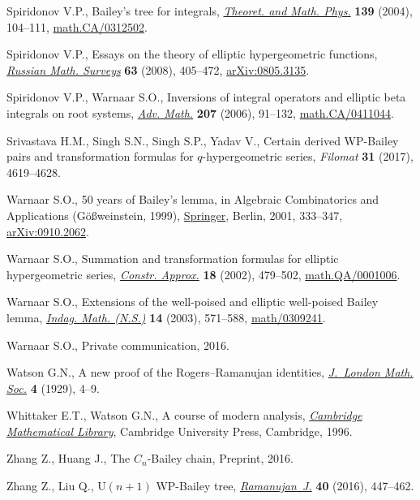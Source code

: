 \documentclass[pdftex]{sigma}
\numberwithin{equation}{section}
\begin{document}
\begin{thebibliography}{99}
Spiridonov V.P., Bailey's tree for integrals, \href{https://doi.org/10.1023/B:TAMP.0000022745.45082.18}{\textit{Theoret. and Math. Phys.}}
 \textbf{139} (2004), 104--111, \href{https://arxiv.org/abs/math.CA/0312502}{math.CA/0312502}.

Spiridonov V.P., Essays on the theory of elliptic hypergeometric functions,
 \href{https://doi.org/10.1070/RM2008v063n03ABEH004533}{\textit{Russian Math. Surveys}} \textbf{63} (2008), 405--472,
 \href{https://arxiv.org/abs/0805.3135}{arXiv:0805.3135}.

Spiridonov V.P., Warnaar S.O., Inversions of integral operators and elliptic
 beta integrals on root systems, \href{https://doi.org/10.1016/j.aim.2005.11.007}{\textit{Adv. Math.}} \textbf{207} (2006),
 91--132, \href{https://arxiv.org/abs/math.CA/0411044}{math.CA/0411044}.

Srivastava H.M., Singh S.N., Singh S.P., Yadav V., Certain derived
 {WP}-{B}ailey pairs and transformation formulas for {$q$}-hypergeometric
 series, \textit{Filomat} \textbf{31} (2017), 4619--4628.

Warnaar S.O., 50 years of {B}ailey's lemma, in Algebraic Combinatorics and
 Applications ({G}\"o\ss weinstein, 1999), \href{https://doi.org/10.1007/978-3-642-59448-9_23}{Springer}, Berlin, 2001, 333--347,
 \href{https://arxiv.org/abs/0910.2062}{arXiv:0910.2062}.

Warnaar S.O., Summation and transformation formulas for elliptic hypergeometric
 series, \href{https://doi.org/10.1007/s00365-002-0501-6}{\textit{Constr. Approx.}} \textbf{18} (2002), 479--502,
 \href{https://arxiv.org/abs/math.QA/0001006}{math.QA/0001006}.

Warnaar S.O., Extensions of the well-poised and elliptic well-poised {B}ailey
 lemma, \href{https://doi.org/10.1016/S0019-3577(03)90061-9}{\textit{Indag. Math. (N.S.)}} \textbf{14} (2003), 571--588,
 \href{https://arxiv.org/abs/math/0309241}{math/0309241}.


Warnaar S.O., {P}rivate communication, 2016.

Watson G.N., A new proof of the {R}ogers--{R}amanujan identities,
 \href{https://doi.org/10.1112/jlms/s1-4.1.4}{\textit{J.~London Math. Soc.}} \textbf{4} (1929), 4--9.

Whittaker E.T., Watson G.N., A course of modern analysis, \href{https://doi.org/10.1017/CBO9780511608759}{\textit{Cambridge
 Mathematical Library}}, Cambridge University Press, Cambridge, 1996.

Zhang Z., Huang J., The ${C}_n$-{B}ailey chain, {P}reprint, 2016.

Zhang Z., Liu Q., {$\mathrm{U}(n+1)$} {WP}-{B}ailey tree, \href{https://doi.org/10.1007/s11139-016-9790-4}{\textit{Ramanujan~J.}}
 \textbf{40} (2016), 447--462.

\end{thebibliography}\LastPageEnding
\end{document}
